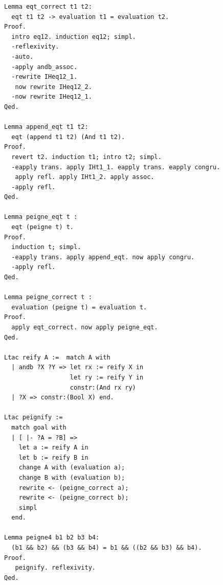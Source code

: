 \documentclass[11pt]{article}
\begin{document}
\begin{lstlisting}[frame=single]
Lemma eqt_correct t1 t2:
  eqt t1 t2 -> evaluation t1 = evaluation t2.
Proof.
  intro eq12. induction eq12; simpl.
  -reflexivity.
  -auto.
  -apply andb_assoc.
  -rewrite IHeq12_1.
   now rewrite IHeq12_2.
  -now rewrite IHeq12_1.
Qed.

Lemma append_eqt t1 t2:
  eqt (append t1 t2) (And t1 t2).
Proof.
  revert t2. induction t1; intro t2; simpl.
  -eapply trans. apply IHt1_1. eapply trans. eapply congru.
   apply refl. apply IHt1_2. apply assoc.
  -apply refl.
Qed.

Lemma peigne_eqt t :
  eqt (peigne t) t.
Proof.
  induction t; simpl.
  -eapply trans. apply append_eqt. now apply congru.
  -apply refl.
Qed.

Lemma peigne_correct t :
  evaluation (peigne t) = evaluation t.
Proof.
  apply eqt_correct. now apply peigne_eqt.
Qed. 

Ltac reify A :=  match A with
  | andb ?X ?Y => let rx := reify X in
                  let ry := reify Y in
                  constr:(And rx ry)
  | ?X => constr:(Bool X) end.

Ltac peignify :=
  match goal with
  | [ |- ?A = ?B] =>
    let a := reify A in
    let b := reify B in
    change A with (evaluation a);
    change B with (evaluation b);
    rewrite <- (peigne_correct a);
    rewrite <- (peigne_correct b);
    simpl
  end.

Lemma peigne4 b1 b2 b3 b4:
  (b1 && b2) && (b3 && b4) = b1 && ((b2 && b3) && b4).
Proof.
   peignify. reflexivity.
Qed.
\end{lstlisting}
\end{document}
